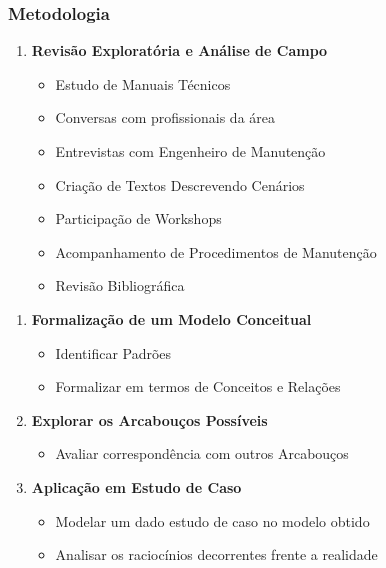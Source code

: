 \documentclass{beamer}
\begin{document}
\begin{frame}
	\frametitle{Metodologia}
	\begin{minipage}[t]{0.48\linewidth}
		\begin{enumerate}
			\item \textbf{Revisão Exploratória e Análise de Campo}
			\begin{itemize}
				\item {\footnotesize Estudo de Manuais Técnicos}
				\item {\footnotesize Conversas com profissionais da área}
				\item {\footnotesize Entrevistas com Engenheiro de Manutenção}
				\item {\footnotesize Criação de Textos Descrevendo Cenários}
				\item {\footnotesize Participação de Workshops}
				\item {\footnotesize Acompanhamento de Procedimentos de Manutenção}
				\item {\footnotesize Revisão Bibliográfica}
			\end{itemize} 				
		\end{enumerate}
	\end{minipage}\hfill
	\begin{minipage}[t]{0.48\linewidth}
		\begin{enumerate}
			\item \textbf{Formalização de um Modelo Conceitual}
			\begin{itemize}
				\item {\footnotesize Identificar Padrões}
				\item {\footnotesize Formalizar em termos de Conceitos e Relações}
			\end{itemize}			 
			\item \textbf{Explorar os Arcabouços Possíveis}
			\begin{itemize}
				\item {\footnotesize Avaliar correspondência com outros Arcabouços}
   			\end{itemize}			 
			\item \textbf{Aplicação em Estudo de Caso}
			\begin{itemize}
				\item {\footnotesize Modelar um dado estudo de caso no modelo obtido}
				\item {\footnotesize Analisar os raciocínios decorrentes frente a realidade}
   			\end{itemize}			 
		\end{enumerate}
	\end{minipage}	 
\end{frame}
\end{document}
